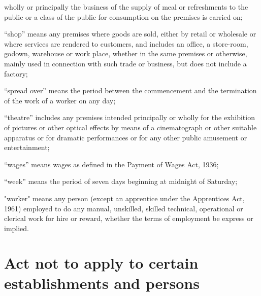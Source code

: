 \documentclass[gaz8]{mhact}
\begin{document}
\begin{subsectionlist}
wholly or principally the business of the supply of meal or refreshments
to the public or a class of the public for consumption on the premises is
carried on;
\item ``shop'' means any premises where goods are sold, either by
retail or wholesale or where services are rendered to customers, and
includes an office, a store-room, godown, warehouse or work place,
whether in the same premises or otherwise, mainly used in connection
with such trade or business, but does not include a factory;
\item ``spread over'' means the period between the commencement
and the termination of the work of a worker on any day;
\item ``theatre'' includes any premises intended principally or wholly
for the exhibition of pictures or other optical effects by means of a
cinematograph or other suitable apparatus or for dramatic performances
or for any other public amusement or entertainment;
\item ``wages'' means wages as defined in the Payment of Wages Act,
1936;
\item ``week'' means the period of seven days beginning at midnight
of Saturday;
\item "worker" means any person (except an apprentice under the
Apprentices Act, 1961) employed to do any manual, unskilled, skilled
technical, operational or clerical work for hire or reward, whether the
terms of employment be express or implied.

\end{subsectionlist}


\section{Act not to apply to certain establishments and persons}
\end{document}
